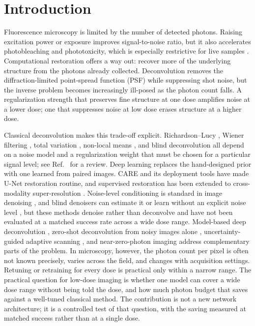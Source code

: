 \documentclass[preprint,12pt]{elsarticle}
\begin{document}
\section{Introduction}
Fluorescence microscopy is limited by the number of detected photons. Raising
excitation power or exposure improves signal-to-noise ratio, but it also
accelerates photobleaching and phototoxicity, which is especially restrictive
for live samples \cite{laissue2017phototoxicity}. Computational restoration
offers a way out: recover more of the underlying structure from the photons
already collected. Deconvolution removes the diffraction-limited point-spread
function (PSF) while suppressing shot noise, but the inverse problem becomes
increasingly ill-posed as the photon count falls. A regularization strength
that preserves fine structure at one dose amplifies noise at a lower dose; one
that suppresses noise at low dose erases structure at a higher dose.

Classical deconvolution makes this trade-off explicit. Richardson--Lucy
\cite{richardson1972,lucy1974}, Wiener filtering \cite{wiener1949}, total
variation \cite{chambolle2004,rudin1992}, non-local means \cite{buades2005},
and blind deconvolution \cite{kundur1996} all depend on a noise model and a
regularization weight that must be chosen for a particular signal level; see
Ref.~\cite{wallace2001} for a review. Deep learning replaces the hand-designed
prior with one learned from paired images. CARE \cite{weigert2018care} and its
deployment tools \cite{gomez2021deepimagej} have made U-Net restoration
routine, and supervised restoration has been extended to cross-modality
super-resolution \cite{wang2019crossmodality}. Noise-level conditioning is
standard in image denoising \cite{zhang2018ffdnet}, and blind denoisers can
estimate it or learn without an explicit noise level
\cite{guo2019cbdnet,mohan2020biasfree,krull2019}, but these methods denoise
rather than deconvolve and have not been evaluated at a matched success rate
across a wide dose range. Model-based deep deconvolution
\cite{liu2020degeneration}, zero-shot deconvolution from noisy images alone
\cite{qiao2024zsdeconvnet}, uncertainty-guided adaptive scanning
\cite{ye2025uncertainty}, and near-zero-photon imaging
\cite{sheneman2025nearzero} address complementary parts of the problem. In
microscopy, however, the photon count per pixel is often not known precisely,
varies across the field, and changes with acquisition settings. Retuning or
retraining for every dose is practical only within a narrow range. The
practical question for low-dose imaging is whether one model can cover a wide
dose range without being told the dose, and how much photon budget that saves
against a well-tuned classical method. The contribution is not a new network
architecture; it is a controlled test of that question, with the saving
measured at matched success rather than at a single dose.
\end{document}
